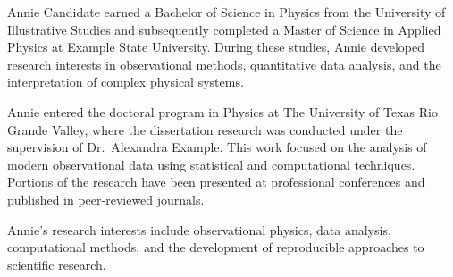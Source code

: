 %
%

Annie Candidate earned a Bachelor of Science in Physics from the University of
Illustrative Studies and subsequently completed a Master of Science in
Applied Physics at Example State University. During these studies, Annie
developed research interests in observational methods, quantitative data
analysis, and the interpretation of complex physical systems.

Annie entered the doctoral program in Physics at The University of Texas Rio
Grande Valley, where the dissertation research was conducted under the
supervision of Dr.\ Alexandra Example. This work focused on the analysis of
modern observational data using statistical and computational techniques.
Portions of the research have been presented at professional conferences and
published in peer-reviewed journals.

Annie's research interests include observational physics, data analysis,
computational methods, and the development of reproducible approaches to
scientific research.